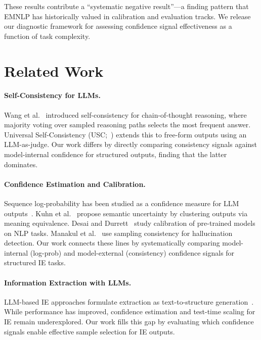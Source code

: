 \documentclass[11pt,a4paper]{article}
\begin{document}
These results contribute a ``systematic negative result''---a finding pattern that EMNLP has historically valued in calibration and evaluation tracks. We release our diagnostic framework for assessing confidence signal effectiveness as a function of task complexity.


\section{Related Work}

\paragraph{Self-Consistency for LLMs.}
Wang et al.~\cite{wang2023selfconsistency} introduced self-consistency for chain-of-thought reasoning, where majority voting over sampled reasoning paths selects the most frequent answer. Universal Self-Consistency (USC;~\cite{chen2024usc}) extends this to free-form outputs using an LLM-as-judge. Our work differs by directly comparing consistency signals against model-internal confidence for structured outputs, finding that the latter dominates.

\paragraph{Confidence Estimation and Calibration.}
Sequence log-probability has been studied as a confidence measure for LLM outputs~\cite{kadavath2022language}. Kuhn et al.~\cite{kuhn2023semantic} propose semantic uncertainty by clustering outputs via meaning equivalence. Desai and Durrett~\cite{desai2020calibration} study calibration of pre-trained models on NLP tasks. Manakul et al.~\cite{manakul2023selfcheckgpt} use sampling consistency for hallucination detection. Our work connects these lines by systematically comparing model-internal (log-prob) and model-external (consistency) confidence signals for structured IE tasks.

\paragraph{Information Extraction with LLMs.}
LLM-based IE approaches formulate extraction as text-to-structure generation~\cite{lu2022unified,wadhwa2023revisiting}. While performance has improved, confidence estimation and test-time scaling for IE remain underexplored. Our work fills this gap by evaluating which confidence signals enable effective sample selection for IE outputs.
\end{document}
